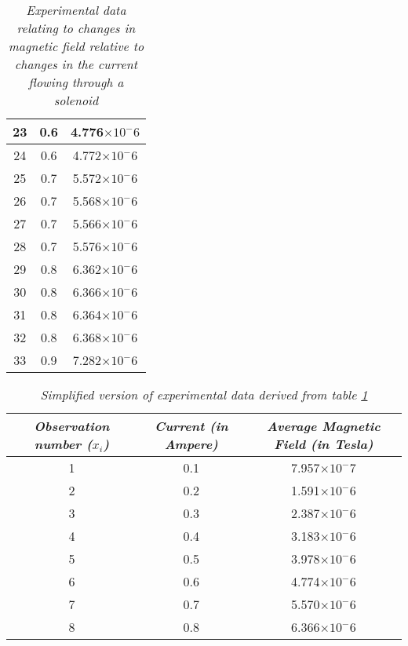 \begin{table}[H]
\begin{tabular}{|c|c|c|}
            \hline
            23 & 0.6 & 4.776$\times10^-6$ \\
            \hline
            24 & 0.6 & 4.772$\times10^-6$ \\
            \hline
            25 & 0.7 & 5.572$\times10^-6$ \\
            \hline
            26 & 0.7 & 5.568$\times10^-6$ \\
            \hline
            27 & 0.7 & 5.566$\times10^-6$ \\
            \hline
            28 & 0.7 & 5.576$\times10^-6$ \\
            \hline
            29 & 0.8 & 6.362$\times10^-6$ \\
            \hline
            30 & 0.8 & 6.366$\times10^-6$ \\
            \hline
            31 & 0.8 & 6.364$\times10^-6$ \\
            \hline
            32 & 0.8 & 6.368$\times10^-6$ \\
            \hline
            33 & 0.9 & 7.282$\times10^-6$ \\
            \hline
            \hline
            \end{tabular}
        \caption{\textit{Experimental data relating to changes in magnetic field relative to changes in the current flowing through a solenoid}} 
        \label{exp2}
\end{table}

\begin{table}[H]
    \centering
        \begin{tabular}{|c|c|c|}
        \hline\hline
                \textit{Observation number ($x_i$)} & \textit{Current (in Ampere)} & \textit{Average Magnetic Field (in Tesla)}\\
                \hline
                \hline
                \hline
                1 & 0.1 & 7.957$\times10^-7$ \\
                \hline
                2 & 0.2 & 1.591$\times10^-6$ \\
                \hline
                3 & 0.3 & 2.387$\times10^-6$ \\
                \hline
                4 & 0.4 & 3.183$\times10^-6$ \\
                \hline
                5 & 0.5 & 3.978$\times10^-6$ \\
                \hline
                6 & 0.6 & 4.774$\times10^-6$ \\
                \hline
                7 & 0.7 & 5.570$\times10^-6$ \\
                \hline
                8 & 0.8 & 6.366$\times10^-6$ \\
                \hline
                \hline
        \end{tabular}
    \caption{\textit{Simplified version of experimental data derived from table \ref{exp2}}}
\end{table}
